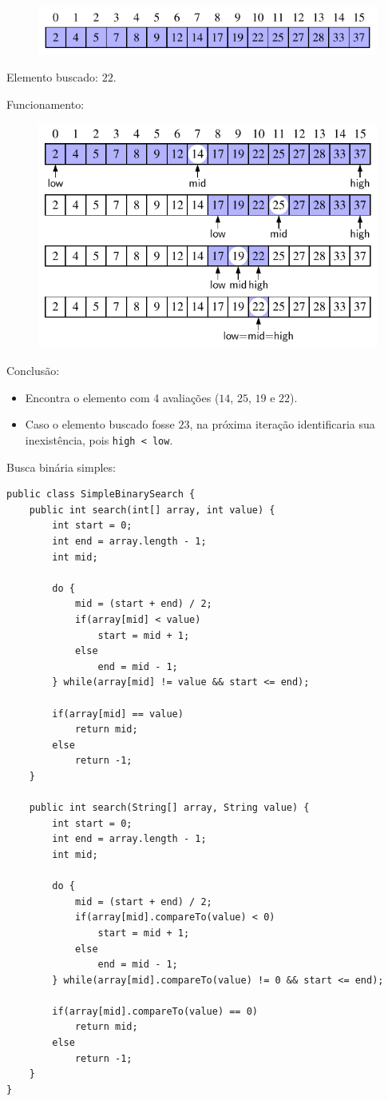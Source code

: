 \begin{figure}[H]
	\centering
	\includegraphics[width=0.7\linewidth]{img/figure-5-4}
\end{figure}

Elemento buscado: $22$.

\medskip

Funcionamento:

\begin{figure}[H]
	\centering
	\includegraphics[width=0.7\linewidth]{img/figure-5-5}
\end{figure}

Conclusão:
\begin{itemize}
	\item Encontra o elemento com 4 avaliações ($14$, $25$, $19$ e $22$).
	\item Caso o elemento buscado fosse $23$, na próxima iteração identificaria sua inexistência, pois \texttt{high < low}.
\end{itemize}

\clearpage

Busca binária simples:
\begin{verbatim}
public class SimpleBinarySearch {
	public int search(int[] array, int value) {
		int start = 0;
		int end = array.length - 1;
		int mid;
		
		do {
			mid = (start + end) / 2;
			if(array[mid] < value)
				start = mid + 1;
			else
				end = mid - 1;	
		} while(array[mid] != value && start <= end);
		
		if(array[mid] == value)
			return mid;
		else
			return -1;
	}
	
	public int search(String[] array, String value) {
		int start = 0;
		int end = array.length - 1;
		int mid;
		
		do {
			mid = (start + end) / 2;
			if(array[mid].compareTo(value) < 0)
				start = mid + 1;
			else
				end = mid - 1;
		} while(array[mid].compareTo(value) != 0 && start <= end);
		
		if(array[mid].compareTo(value) == 0)
			return mid;
		else
			return -1;
	}
}
\end{verbatim}

